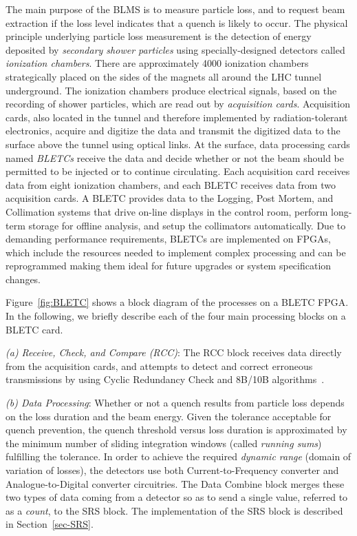 \documentclass{llncs}
\begin{document}
The main purpose of the BLMS is to measure particle loss, and to request beam extraction if the loss level indicates that a quench is likely to occur.
The physical principle underlying particle loss measurement \cite{Dehning-IPAC,Chris-FPGA} is the detection of energy deposited by \emph{secondary shower particles} using specially-designed detectors called  \emph{ionization chambers}.
There are approximately 4000 ionization chambers strategically placed on the sides of the magnets all around the LHC tunnel underground.
The ionization chambers produce electrical signals, based on the recording of shower particles, which are read out by \emph{acquisition cards}.
Acquisition cards, also located in the tunnel and therefore implemented by radiation-tolerant electronics, acquire and digitize the data and transmit the digitized data to the surface above the tunnel using optical links.
At the surface, data processing cards named \emph{BLETCs} receive the data and decide whether or not the beam should be permitted to be injected or to continue circulating.
Each acquisition card receives data from eight ionization chambers, and each BLETC receives data from two acquisition cards.
A BLETC provides data to the Logging, Post Mortem, and Collimation systems that drive on-line displays in the control room, perform long-term storage for offline analysis, and setup the collimators automatically.
Due to demanding performance requirements, BLETCs are implemented on FPGAs, which include the resources needed to implement complex processing and can be reprogrammed making them ideal for future upgrades or system specification changes.

Figure~\ref{fig:BLETC} shows a block diagram of the processes on a BLETC FPGA.
In the following, we briefly describe each of the four main processing blocks on a BLETC card.

\emph{(a) Receive, Check, and Compare (RCC)}: The RCC block receives data directly from the acquisition cards, and attempts to detect and correct erroneous transmissions by using Cyclic Redundancy Check and 8B/10B algorithms~\cite{CRC,8B10B}.

\emph{(b) Data Processing}: Whether or not a quench results from particle loss depends on the loss duration and the beam energy.
Given the tolerance acceptable for quench prevention, the quench threshold versus loss duration is approximated by the minimum number of sliding integration windows (called \emph{running sums}) fulfilling the tolerance.
In order to achieve the required \emph{dynamic range} (domain of variation of losses), the detectors use both Current-to-Frequency converter and Analogue-to-Digital converter circuitries.
The Data Combine block merges these two types of data coming from a detector so as to send a single value, referred to as a \emph{count}, to the SRS block.
The implementation of the SRS block is described in Section~\ref{sec-SRS}.
\end{document}

